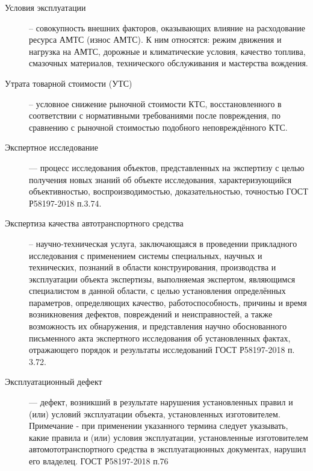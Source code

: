 \begin{description}
	\item[Условия эксплуатации] -- совокупность внешних факторов, оказывающих влияние на расходование ресурса АМТС (износ АМТС). К ним относятся: режим движения и нагрузка на АМТС, дорожные и климатические условия, качество топлива, смазочных материалов, технического обслуживания и мастерства вождения. 

	\item[Утрата товарной стоимости (УТС)]-- условное снижение рыночной стоимости КТС, восстановленного в соответствии с нормативными требованиями после повреждения, по сравнению с рыночной стоимостью подобного неповреждённого КТС. 
	


	
	\item[Экспертное исследование] --- процесс исследования объектов, представленных на экспертизу с целью получения новых знаний об объекте исследования, характеризующийся объективностью, воспроизводимостью, доказательностью, точностью ГОСТ Р58197-2018 п.3.74.
	
	
	\item[Экспертиза качества автотранспортного средства] -- научно-техническая услуга, заключающаяся в проведении прикладного исследования с применением системы специальных, научных и технических, познаний в области конструирования, производства и эксплуатации объекта экспертизы, выполняемая экспертом, являющимся специалистом в данной области, с целью установления определённых параметров, определяющих качество, работоспособность, причины и время возникновения дефектов, повреждений и неисправностей, а также возможность их обнаружения, и представления научно обоснованного письменного акта экспертного исследования об установленных фактах, отражающего порядок и результаты исследований ГОСТ Р58197-2018 п. 3.72.
	
	
%	
	\item[Эксплуатационный дефект] --- дефект, возникший в результате нарушения установленных правил и (или) условий эксплуатации объекта, установленных изготовителем. Примечание - при применении указанного термина следует указывать, какие правила и (или) условия эксплуатации, установленные изготовителем автомототранспортного средства в эксплуатационных документах, нарушил его владелец. ГОСТ Р58197-2018 п.76
	

\end{description}
